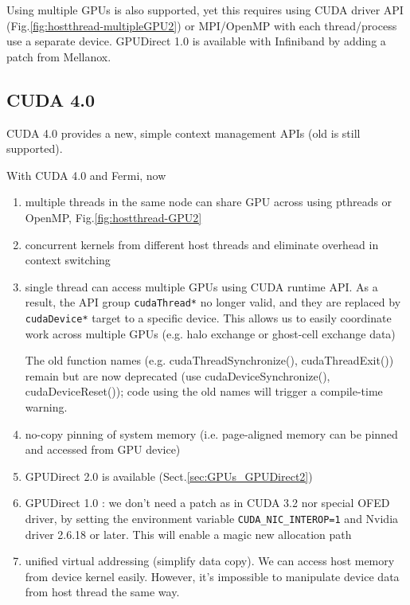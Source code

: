 Using multiple GPUs is also supported, yet this requires using CUDA driver API
(Fig.\ref{fig:hostthread-multipleGPU2}) or MPI/OpenMP with each thread/process
use a separate device. GPUDirect 1.0 is available with Infiniband by adding a
patch from Mellanox. 


  
\subsection{CUDA 4.0}
\label{sec:CUDA_4.0}

CUDA 4.0 provides a new, simple context management APIs (old is still
supported). 

With CUDA 4.0 and Fermi, now
\begin{enumerate}
  
  \item multiple threads in the same node can share GPU across using pthreads
  or OpenMP, Fig.\ref{fig:hostthread-GPU2}
  
  \item concurrent kernels from different host threads and eliminate overhead in
  context switching
  
  \item single thread can access multiple GPUs using CUDA runtime API. As a
  result, the API group \verb!cudaThread*! no longer valid, and they are
  replaced by \verb!cudaDevice*! target to a specific device. This allows us
  to easily coordinate work across multiple GPUs (e.g. halo exchange or
  ghost-cell exchange data)
  
 The old function names (e.g. cudaThreadSynchronize(), cudaThreadExit()) remain
 but are now deprecated (use cudaDeviceSynchronize(), cudaDeviceReset()); code
 using the old names will trigger a compile-time warning.

  \item no-copy pinning of system memory (i.e. page-aligned memory can be
  pinned and accessed from GPU device)
  
  \item GPUDirect 2.0 is available (Sect.\ref{sec:GPUs_GPUDirect2})
  
  \item GPUDirect 1.0 : we don't need a patch as in CUDA 3.2 nor special OFED
  driver, by setting the environment variable \verb!CUDA_NIC_INTEROP=1! and
  Nvidia driver 2.6.18 or later. This will enable a magic new allocation path 
  
  \item unified virtual addressing (simplify data copy). We can access host
  memory from device kernel easily. However, it's impossible to manipulate
  device data from host thread the same way.
  

\end{enumerate}
